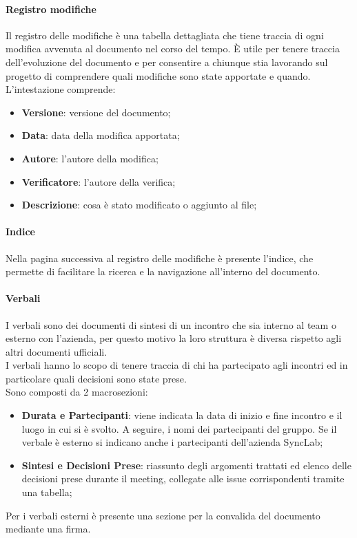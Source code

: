     \paragraph{Registro modifiche}
    Il registro delle modifiche è una tabella dettagliata che tiene traccia di ogni modifica avvenuta al documento nel corso del tempo. È utile per tenere traccia dell’evoluzione del documento e per consentire a chiunque stia lavorando sul progetto di comprendere quali modifiche sono state apportate e quando.
    L’intestazione comprende:
    \begin{itemize}
    \item \textbf{Versione}: versione del documento;
    \item \textbf{Data}: data della modifica apportata;
    \item \textbf{Autore}: l’autore della modifica;
    \item \textbf{Verificatore}: l’autore della verifica;
    \item \textbf{Descrizione}: cosa è stato modificato o aggiunto al file;
    \end{itemize}

    \paragraph{Indice}
    Nella pagina successiva al registro delle modifiche è presente l’indice, che permette di facilitare la ricerca e la navigazione all’interno del documento. \\

    \paragraph{Verbali}
    I verbali sono dei documenti di sintesi di un incontro che sia interno al team o esterno con l'azienda, per questo motivo la loro struttura è diversa rispetto agli altri documenti ufficiali.\\
    I verbali hanno lo scopo di tenere traccia di chi ha partecipato agli incontri ed in particolare quali decisioni sono state prese.\\
    Sono composti da 2 macrosezioni:
    \begin{itemize}
    \item  \textbf{Durata e Partecipanti}: viene indicata la data di inizio e fine incontro e il luogo in cui si è svolto. A seguire, i nomi dei partecipanti del gruppo. Se il verbale è esterno si indicano anche i partecipanti dell'azienda SyncLab;
    \item  \textbf{Sintesi e Decisioni Prese}: riassunto degli argomenti trattati ed elenco delle decisioni prese durante il meeting, collegate alle issue corrispondenti tramite una tabella;
    \end{itemize}
    Per i verbali esterni è presente una sezione per la convalida del documento mediante una firma.\\

